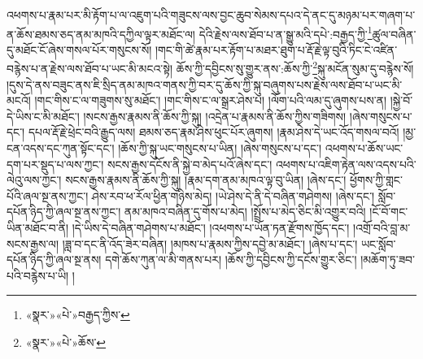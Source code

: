 འཕགས་པ་རྣམ་པར་མི་རྟོག་པ་ལ་འཇུག་པའི་གཟུངས་ལས་བྱང་ཆུབ་སེམས་དཔའ་དེ་ནང་དུ་མཉམ་པར་གཞག་པ་ན་ཆོས་ཐམས་ཅད་ནམ་མཁའི་དཀྱིལ་ལྟར་མཐོང་ལ། དེའི་རྗེས་ལས་ཐོབ་པ་ན་སྒྱུ་མའི་དཔེ་:བརྒྱད་ཀྱི་\footnote{«སྣར་»«པེ་»བརྒྱད་ཀྱིས་}ཚུལ་བཞིན་དུ་མཐོང་ངོ་ཞེས་གསལ་པོར་གསུངས་སོ། །གང་གི་ཚེ་རྣམ་པར་རྟོག་པ་མཐར་ཐུག་པ་རྡོ་རྗེ་ལྟ་བུའི་ཏིང་ངེ་འཛིན་བརྙེས་པ་ན་རྗེས་ལས་ཐོབ་པ་ཡང་མི་མངའ་སྟེ། ཆོས་ཀྱི་དབྱིངས་སུ་གྱུར་ནས་:ཆོས་ཀྱི་\footnote{«སྣར་»«པེ་»ཆོས་}སྐུ་མངོན་སུམ་དུ་བརྙེས་སོ། །དུས་དེ་ནས་བཟུང་ནས་ཇི་སྲིད་ནམ་མཁའ་གནས་ཀྱི་བར་དུ་ཆོས་ཀྱི་སྐུ་བཞུགས་པས་རྗེས་ལས་ཐོབ་པ་ཡང་མི་མངའོ། །གང་གིས་ང་ལ་གཟུགས་སུ་མཐོང་། །གང་གིས་ང་ལ་སྒྲར་ཤེས་པ། །ལོག་པའི་ལམ་དུ་ཞུགས་པས་ན། །སྐྱེ་བོ་དེ་ཡིས་ང་མི་མཐོང་། །སངས་རྒྱས་རྣམས་ནི་ཆོས་ཀྱི་སྐུ། །འདྲེན་པ་རྣམས་ནི་ཆོས་ཀྱིས་གཟིགས། །ཞེས་གསུངས་པ་དང་། དཔལ་རྡོ་རྗེ་ཕྲེང་བའི་རྒྱུད་ལས། ཐམས་ཅད་རྣམ་ཤེས་ཕུང་པོར་ཞུགས། །རྣམ་ཤེས་དེ་ཡང་འོད་གསལ་བའོ། །མྱ་ངན་འདས་དང་ཀུན་སྟོང་དང་། །ཆོས་ཀྱི་སྐུ་ཡང་གསུངས་པ་ཡིན། །ཞེས་གསུངས་པ་དང་། འཕགས་པ་ཆོས་ཡང་དག་པར་སྡུད་པ་ལས་ཀྱང་། སངས་རྒྱས་དངོས་ནི་སྐྱེ་བ་མེད་པའོ་ཞེས་དང་། འཕགས་པ་འཇིག་རྟེན་ལས་འདས་པའི་ལེའུ་ལས་ཀྱང་། སངས་རྒྱས་རྣམས་ནི་ཆོས་ཀྱི་སྐུ། །རྣམ་དག་ནམ་མཁའ་ལྟ་བུ་ཡིན། །ཞེས་དང་། ཕྱོགས་ཀྱི་གླང་པོའི་ཞལ་སྔ་ནས་ཀྱང་། ཤེས་རབ་ཕ་རོལ་ཕྱིན་གཉིས་མེད། །ཡེ་ཤེས་དེ་ནི་དེ་བཞིན་གཤེགས། །ཞེས་དང་། སློབ་དཔོན་ཉིད་ཀྱི་ཞལ་སྔ་ནས་ཀྱང་། ནམ་མཁའ་བཞིན་དུ་གོས་པ་མེད། །སྤྲོས་པ་མེད་ཅིང་མི་འགྱུར་བའི། །ངོ་བོ་གང་ཡིན་མཐོང་བ་ནི། །དེ་ཡིས་དེ་བཞིན་གཤེགས་པ་མཐོང་། །འཕགས་པ་ཡོན་ཏན་རྫོགས་ཁྱོད་དང་། །འགྲོ་བའི་བླ་མ་སངས་རྒྱས་ལ། །ཟླ་བ་དང་ནི་འོད་ཟེར་བཞིན། །མཁས་པ་རྣམས་ཀྱིས་དབྱེ་མ་མཐོང་། །ཞེས་པ་དང་། ཡང་སློབ་དཔོན་ཉིད་ཀྱི་ཞལ་སྔ་ནས། དགེ་ཆོས་ཀུན་ལ་མི་གནས་པར། །ཆོས་ཀྱི་དབྱིངས་ཀྱི་དངོས་གྱུར་ཅིང་། །མཆོག་ཏུ་ཟབ་པའི་བརྙེས་པ་ཡི། །
